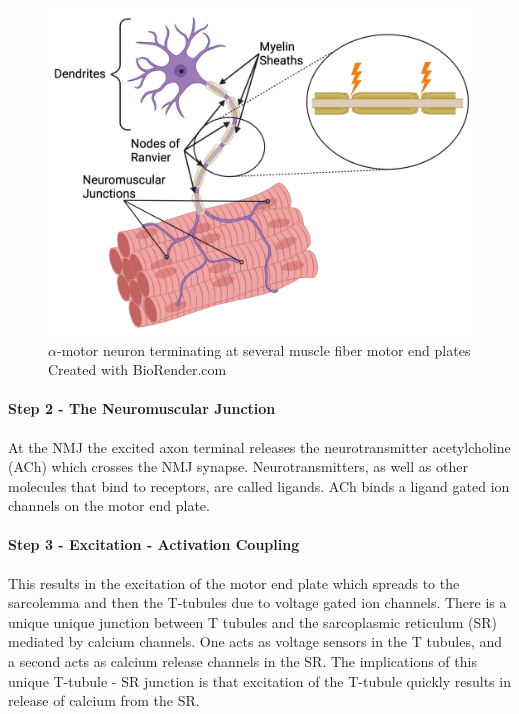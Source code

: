 \begin{figure}[!ht]
    \centering
    \includegraphics[width=1\linewidth]{./figure/Motoneuron.png}
    \caption{$\alpha$-motor neuron terminating at several muscle fiber motor end plates \footnotesize{Created with BioRender.com}}
    \label{fig:Motoneuron}
\end{figure}


\paragraph{Step 2 - The Neuromuscular Junction}

At the NMJ the excited axon terminal releases the neurotransmitter acetylcholine (ACh) which crosses the NMJ synapse. Neurotransmitters, as well as other molecules that bind to receptors, are called ligands. ACh binds a ligand gated ion channels on the motor end plate. 


\paragraph{Step 3 - Excitation - Activation Coupling}
This results in the excitation of the motor end plate which spreads to the sarcolemma and then the T-tubules due to voltage gated ion channels. There is a unique unique junction between T tubules and the sarcoplasmic reticulum (SR) mediated by calcium channels. One acts as voltage sensors in the T tubules, and a second acts as calcium release channels in the SR.\footnotemark{} The implications of this unique T-tubule - SR junction is that excitation of the T-tubule quickly results in release of calcium from the SR.


